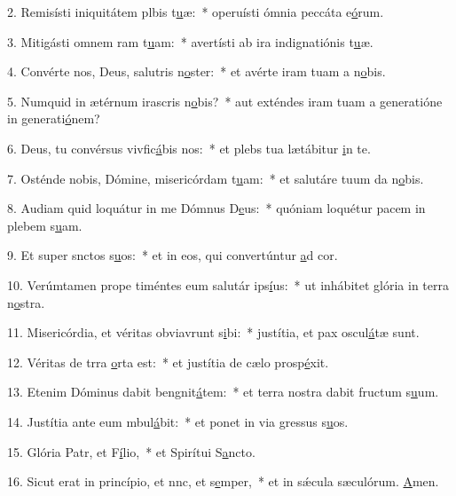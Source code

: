 2. Remisísti iniquitátem plbis t\uline{u}æ:~* operuísti ómnia peccáta e\uline{ó}rum.\par 
3. Mitigásti omnem ram t\uline{u}am:~* avertísti ab ira indignatiónis t\uline{u}æ.\par 
4. Convérte nos, Deus, salutris n\uline{o}ster:~* et avérte iram tuam a n\uline{o}bis.\par 
5. Numquid in ætérnum irascris n\uline{o}bis?~* aut exténdes iram tuam a generatióne in generati\uline{ó}nem?\par 
6. Deus, tu convérsus vivfic\uline{á}bis nos:~* et plebs tua lætábitur \uline{i}n te.\par 
7. Osténde nobis, Dómine, misericórdam t\uline{u}am:~* et salutáre tuum da n\uline{o}bis.\par 
8. Audiam quid loquátur in me Dómnus D\uline{e}us:~* quóniam loquétur pacem in plebem s\uline{u}am.\par 
9. Et super snctos s\uline{u}os:~* et in eos, qui convertúntur \uline{a}d cor.\par 
10. Verúmtamen prope timéntes eum salutár ips\uline{í}us:~* ut inhábitet glória in terra n\uline{o}stra.\par 
11. Misericórdia, et véritas obviavrunt s\uline{i}bi:~* justítia, et pax oscul\uline{á}tæ sunt.\par 
12. Véritas de trra \uline{o}rta est:~* et justítia de cælo prosp\uline{é}xit.\par 
13. Etenim Dóminus dabit bengnit\uline{á}tem:~* et terra nostra dabit fructum s\uline{u}um.\par 
14. Justítia ante eum mbul\uline{á}bit:~* et ponet in via gressus s\uline{u}os.\par 
15. Glória Patr, et F\uline{í}lio,~* et Spirítui S\uline{a}ncto.\par 
16. Sicut erat in princípio, et nnc, et s\uline{e}mper,~* et in sǽcula sæculórum. \uline{A}men.\par 
